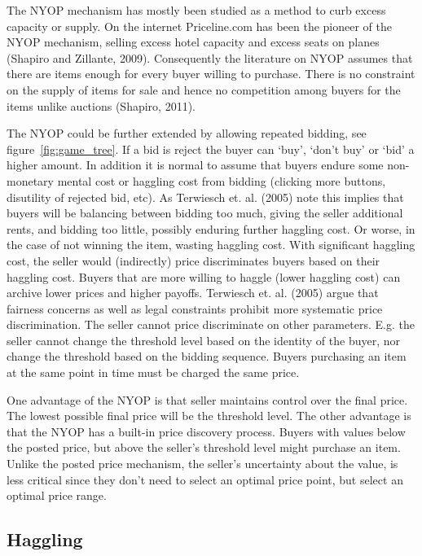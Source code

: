 \documentclass[a4paper,12pt]{article}
\begin{document}
	The NYOP mechanism has mostly been studied as a method to curb excess capacity or supply. On the internet Priceline.com has been the pioneer of the NYOP mechanism, selling excess hotel capacity and excess seats on planes (Shapiro and Zillante, 2009). Consequently the literature on NYOP assumes that there are items enough for every buyer willing to purchase. There is no constraint on the supply of items for sale and hence no competition among buyers for the items unlike auctions (Shapiro, 2011).
	
	The NYOP could be further extended by allowing repeated bidding, see figure~\ref{fig:game_tree}. If a bid is reject the buyer can `buy', `don't buy' or `bid' a higher amount. In addition it is normal to assume that buyers endure some non-monetary mental cost or haggling cost from bidding (clicking more buttons, disutility of rejected bid, etc). As Terwiesch et. al. (2005) note this implies that buyers will be balancing between bidding too much, giving the seller additional rents, and bidding too little, possibly enduring further haggling cost. Or worse, in the case of not winning the item, wasting haggling cost. With significant haggling cost, the seller would (indirectly) price discriminates buyers based on their haggling cost. Buyers that are more willing to haggle (lower haggling cost) can archive lower prices and higher payoffs. Terwiesch et. al. (2005) argue that fairness concerns as well as legal constraints prohibit more systematic price discrimination. The seller cannot price discriminate on other parameters. E.g. the seller cannot change the threshold level based on the identity of the buyer, nor change the threshold based on the bidding sequence. Buyers purchasing an item at the same point in time must be charged the same price.

	One advantage of the NYOP is that seller maintains control over the final price. The lowest possible final price will be the threshold level. The other advantage is that the NYOP has a built-in price discovery process. Buyers with values below the posted price, but above the seller's threshold level might purchase an item. Unlike the posted price mechanism, the seller's uncertainty about the value, is less critical since they don't need to select an optimal price point, but select an optimal price range.

	\subsection{Haggling}
\end{document}
